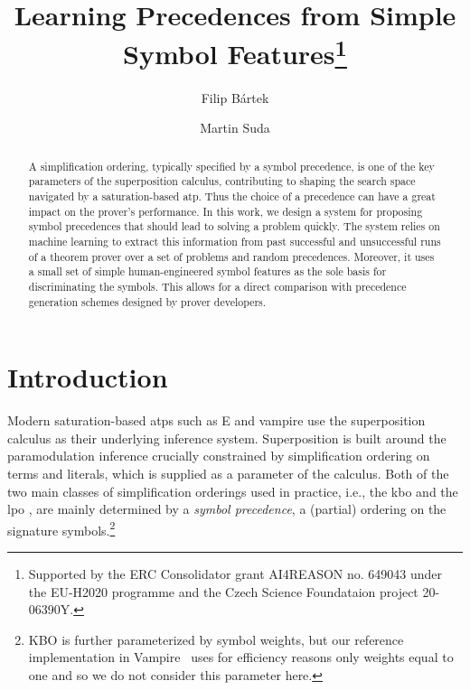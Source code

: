 

\title{Learning Precedences from Simple Symbol Features\thanks{Supported by the ERC Consolidator grant AI4REASON no. 649043 under the EU-H2020 programme and the Czech Science Foundataion project 20-06390Y.}}
\author{Filip B\'{a}rtek \and Martin Suda}



\maketitle

\begin{abstract}
A simplification ordering, typically specified by a symbol precedence,
is one of the key parameters of the superposition calculus, contributing
to shaping the search space navigated by a saturation-based \acrlong{atp}.
Thus the choice of a precedence can have a great impact on the prover's performance.
In this work, we design a system for proposing symbol precedences
that should lead to solving a problem quickly.
The system relies on machine learning to extract this information from
past successful and unsuccessful runs of a theorem prover over a set of problems and random precedences.
Moreover, it uses a small set of simple human-engineered symbol features as the sole
basis for discriminating the symbols. This allows for a direct comparison
with precedence generation schemes designed by prover developers.
\end{abstract}

\section{Introduction}

Modern saturation-based \glspl{atp} such as E \cite{SCV:CADE-2019} and \gls{vampire} \cite{Kovacs2013}
use the superposition calculus \cite{Nieuwenhuis2001} as their underlying inference system.
Superposition is built around the paramodulation inference \cite{Robinson1983} crucially
constrained by simplification ordering on terms and literals, which is supplied as a parameter of the calculus.
Both of the two main classes of simplification orderings used in practice,
i.e., the \acrlong{kbo} \cite{Knuth1983}
and the \acrlong{lpo} \cite{Kamin1980},
are mainly determined by a %
\emph{symbol precedence}, a (partial) ordering on the signature symbols.\footnote{
KBO is further parameterized by symbol weights, but our reference implementation in Vampire~\cite{Kovacs2013} 
uses for efficiency reasons only weights equal to one \cite{DBLP:conf/cade/KovacsMV11} and so we do not consider this parameter here.}

